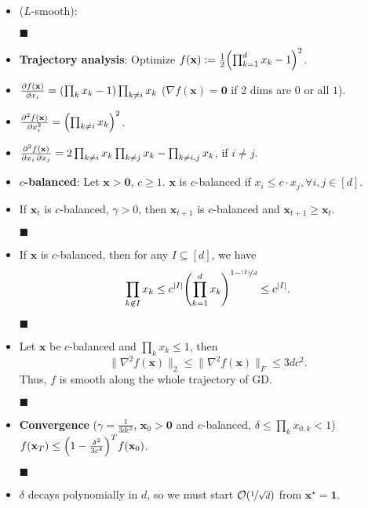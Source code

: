 \documentclass[a4paper]{article}
\newcommand{\lft}{\mathopen{}\mathclose\bgroup\left}
\newcommand{\rgt}{\aftergroup\egroup\right}
\renewcommand{\vec}[1]{\mathbf{#1}}
\newcommand{\proofsquare}{$\blacksquare$}
\newenvironment{topic}[1]
{\textbf{\sffamily \colorbox{black}{\rlap{\textbf{\textcolor{white}{#1}}}\hspace{\linewidth}\hspace{-2\fboxsep}}} \\ \vspace{0.2cm}}
{}
\begin{document}
\begin{multicols*}{2}
    \begin{topic}{Nonconvex functions}
        \begin{itemize}
            \item ($L$-smooth):
            \item[\proofsquare]
            \item \textbf{Trajectory analysis}: Optimize $f(\vec{x}) := \frac{1}{2} \lft( \prod_{k=1}^d x_k - 1 \rgt)^2$.
            \item $\pdv{f(\vec{x})}{x_i} = \lft( \prod_k x_k - 1 \rgt) \prod_{k\neq i} x_k$ ($\nabla f(\vec{x})=\vec{0}$ if 2 dims are $0$ or all $1$).
            \item $\pdv[order=2]{f(\vec{x})}{x_i} = \lft( \prod_{k\neq i} x_k \rgt)^2$.
            \item $\pdv{f(\vec{x})}{x_i,x_j} = 2 \prod_{k\neq i} x_k \prod_{k \neq j} x_k - \prod_{k\neq i,j} x_k$, if $i \neq j$.
            \item \textbf{$c$-balanced}: Let $\vec{x} > \vec{0}$, $c \geq 1$. $\vec{x}$ is $c$-balanced if $x_i \leq c \cdot x_j, \forall i, j \in [d]$.
            \item If $\vec{x}_t$ is $c$-balanced, $\gamma > 0$, then $\vec{x}_{t+1}$ is $c$-balanced and
                  $\vec{x}_{t+1} \geq \vec{x}_t$.
            \item[\proofsquare]
            \item If $\vec{x}$ is $c$-balanced, then for any $I \subseteq [d]$, we have \[
                      \prod_{k \not\in I} x_k \leq c^{|I|} \lft( \prod_{k=1}^d x_k \rgt)^{1 - \nicefrac{|I|}{d}} \leq c^{|I|}.
                  \]
            \item[\proofsquare]
            \item Let $\vec{x}$ be $c$-balanced and $\prod_k x_k \leq 1$, then \[
                      \| \nabla^2 f(\vec{x}) \|_2 \leq \| \nabla^2 f(\vec{x}) \|_F \leq 3dc^2.
                  \]
                  Thus, $f$ is smooth along the whole trajectory of GD.
            \item[\proofsquare]
            \item \textbf{Convergence} ($\gamma = \frac{1}{3dc^2}$, $\vec{x}_0 > \vec{0}$ and $c$-balanced, $\delta \leq \prod_k x_{0,k} < 1$) \\ $f(\vec{x}_T) \leq \lft( 1 - \frac{\delta^2}{3c^4} \rgt)^T f(\vec{x}_0)$.
            \item[\proofsquare]
            \item $\delta$ decays polynomially in $d$, so we must start $\mathcal{O}(\nicefrac{1}{\sqrt{d}})$ from $\vec{x}^\star = \vec{1}$.
        \end{itemize}
    \end{topic}


\end{multicols*}
\end{document}
